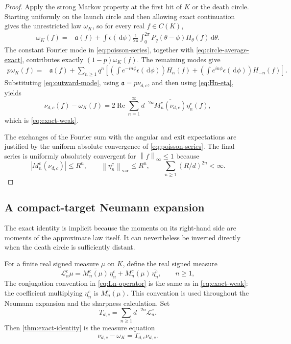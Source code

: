 \documentclass[11pt]{article}
\theoremstyle{mainthm}
\theoremstyle{definition}
\theoremstyle{remark}
\newcommand{\dd}{\,\mathrm d}
\newcommand{\Real}{\operatorname{Re}}
\newcommand{\norm}[1]{\left\lVert #1\right\rVert}
\begin{document}
\begin{proof}
Apply the strong Markov property at the first hit of $K$ or the death circle. Starting uniformly on the launch circle and then allowing exact continuation gives the unrestricted law $\omega_K$, so for every real $f\in C(K)$,
\begin{align}
  \omega_K(f)
  ={}&\mathfrak a(f)
  +\int\epsilon(\dd\phi)
    \frac1{2\pi}\int_0^{2\pi}
      P_q(\theta-\phi)H_\theta(f)\dd\theta.
  \label{eq:renewal-before-fourier}
\end{align}
The constant Fourier mode in \eqref{eq:poisson-series}, together with \eqref{eq:circle-average-exact}, contributes exactly $(1-p)\omega_K(f)$. The remaining modes give
\begin{align}
  p\omega_K(f)
  ={}&\mathfrak a(f)
  +\sum_{n\ge1}q^n
  \left[
    \left(\int e^{-in\phi}\epsilon(\dd\phi)\right)H_n(f)
    +\left(\int e^{in\phi}\epsilon(\dd\phi)\right)H_{-n}(f)
  \right].
  \label{eq:renewal-fourier}
\end{align}
Substituting \eqref{eq:outward-mode}, using $\mathfrak a=p\nu_{d,c}$, and then using \eqref{eq:Hn-eta}, yields
\[
  \nu_{d,c}(f)-\omega_K(f)
  =2\Real\sum_{n=1}^{\infty}
    d^{-2n}\overline{M_n^c(\nu_{d,c})}\eta_n^c(f),
\]
which is \eqref{eq:exact-weak}.

The exchanges of the Fourier sum with the angular and exit expectations are justified by the uniform absolute convergence of \eqref{eq:poisson-series}. The final series is uniformly absolutely convergent for $\norm{f}_\infty\le1$ because
\[
  |M_n^c(\nu_{d,c})|\le R^n,
  \qquad
  \norm{\eta_n^c}_{\mathrm{var}}\le R^n,
  \qquad
  \sum_{n\ge1}(R/d)^{2n}<\infty.
\]
\end{proof}

\subsection{A compact-target Neumann expansion}

The exact identity is implicit because the moments on its right-hand side are moments of the approximate law itself. It can nevertheless be inverted directly when the death circle is sufficiently distant.

For a finite real signed measure $\mu$ on $K$, define the real signed measure
\begin{equation}
  \mathcal L_n^c\mu
  =\overline{M_n^c(\mu)}\,\eta_n^c
   +M_n^c(\mu)\,\overline{\eta_n^c},
  \qquad n\ge1,
  \label{eq:Ln-operator}
\end{equation}
The conjugation convention in \eqref{eq:Ln-operator} is the same as in \eqref{eq:exact-weak}: the coefficient multiplying $\eta_n^c$ is $\overline{M_n^c(\mu)}$. This convention is used throughout the Neumann expansion and the sharpness calculation.
Set
\begin{equation}
  T_{d,c}=\sum_{n\ge1}d^{-2n}\mathcal L_n^c.
  \label{eq:T-operator}
\end{equation}
Then \cref{thm:exact-identity} is the measure equation
\begin{equation}
  \nu_{d,c}-\omega_K=T_{d,c}\nu_{d,c}.
  \label{eq:operator-equation}
\end{equation}
\end{document}
